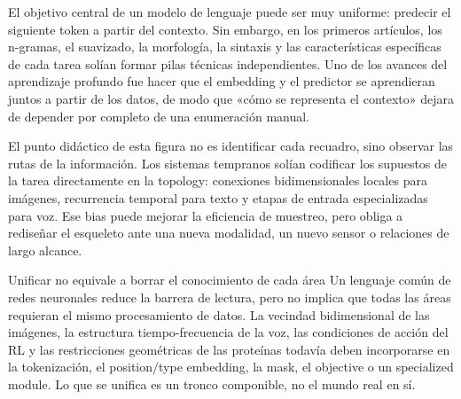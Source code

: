 
El objetivo central de un modelo de lenguaje puede ser muy uniforme: predecir el siguiente token a partir del contexto. Sin embargo, en los primeros artículos, los n-gramas, el suavizado, la morfología, la sintaxis y las características específicas de cada tarea solían formar pilas técnicas independientes. Uno de los avances del aprendizaje profundo fue hacer que el embedding y el predictor se aprendieran juntos a partir de los datos, de modo que «cómo se representa el contexto» dejara de depender por completo de una enumeración manual.


El punto didáctico de esta figura no es identificar cada recuadro, sino observar las rutas de la información. Los sistemas tempranos solían codificar los supuestos de la tarea directamente en la topology: conexiones bidimensionales locales para imágenes, recurrencia temporal para texto y etapas de entrada especializadas para voz. Ese bias puede mejorar la eficiencia de muestreo, pero obliga a rediseñar el esqueleto ante una nueva modalidad, un nuevo sensor o relaciones de largo alcance.


\begin{warningbox}{Unificar no equivale a borrar el conocimiento de cada área}
Un lenguaje común de redes neuronales reduce la barrera de lectura, pero no implica que todas las áreas requieran el mismo procesamiento de datos. La vecindad bidimensional de las imágenes, la estructura tiempo-frecuencia de la voz, las condiciones de acción del RL y las restricciones geométricas de las proteínas todavía deben incorporarse en la tokenización, el position/type embedding, la mask, el objective o un specialized module. Lo que se unifica es un tronco componible, no el mundo real en sí.
\end{warningbox}

